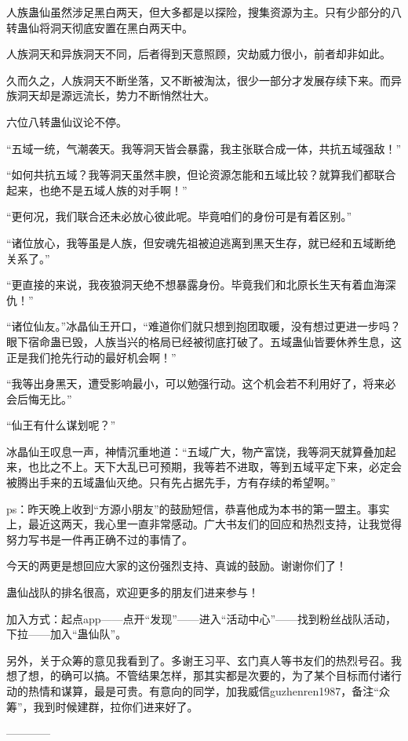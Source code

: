 \begin{this_body}
人族蛊仙虽然涉足黑白两天，但大多都是以探险，搜集资源为主。只有少部分的八转蛊仙将洞天彻底安置在黑白两天中。

人族洞天和异族洞天不同，后者得到天意照顾，灾劫威力很小，前者却非如此。

久而久之，人族洞天不断坐落，又不断被淘汰，很少一部分才发展存续下来。而异族洞天却是源远流长，势力不断悄然壮大。

六位八转蛊仙议论不停。

“五域一统，气潮袭天。我等洞天皆会暴露，我主张联合成一体，共抗五域强敌！”

“如何共抗五域？我等洞天虽然丰腴，但论资源怎能和五域比较？就算我们都联合起来，也绝不是五域人族的对手啊！”

“更何况，我们联合还未必放心彼此呢。毕竟咱们的身份可是有着区别。”

“诸位放心，我等虽是人族，但安魂先祖被迫逃离到黑天生存，就已经和五域断绝关系了。”

“更直接的来说，我夜狼洞天绝不想暴露身份。毕竟我们和北原长生天有着血海深仇！”

“诸位仙友。”冰晶仙王开口，“难道你们就只想到抱团取暖，没有想过更进一步吗？眼下宿命蛊已毁，人族当兴的格局已经被彻底打破了。五域蛊仙皆要休养生息，这正是我们抢先行动的最好机会啊！”

“我等出身黑天，遭受影响最小，可以勉强行动。这个机会若不利用好了，将来必会后悔无比。”

“仙王有什么谋划呢？”

冰晶仙王叹息一声，神情沉重地道：“五域广大，物产富饶，我等洞天就算叠加起来，也比之不上。天下大乱已可预期，我等若不进取，等到五域平定下来，必定会被腾出手来的五域蛊仙灭绝。只有先占据先手，方有存续的希望啊。”

ps：昨天晚上收到“方源小朋友”的鼓励短信，恭喜他成为本书的第一盟主。事实上，最近这两天，我心里一直非常感动。广大书友们的回应和热烈支持，让我觉得努力写书是一件再正确不过的事情了。

今天的两更是想回应大家的这份强烈支持、真诚的鼓励。谢谢你们了！

蛊仙战队的排名很高，欢迎更多的朋友们进来参与！

加入方式：起点app——点开“发现”——进入“活动中心”——找到粉丝战队活动，下拉——加入“蛊仙队”。

另外，关于众筹的意见我看到了。多谢王习平、玄门真人等书友们的热烈号召。我想了想，的确可以搞。不管结果怎样，那其实都是次要的，为了某个目标而付诸行动的热情和谋算，最是可贵。有意向的同学，加我威信guzhenren1987，备注“众筹”，我到时候建群，拉你们进来好了。

------------

\end{this_body}

